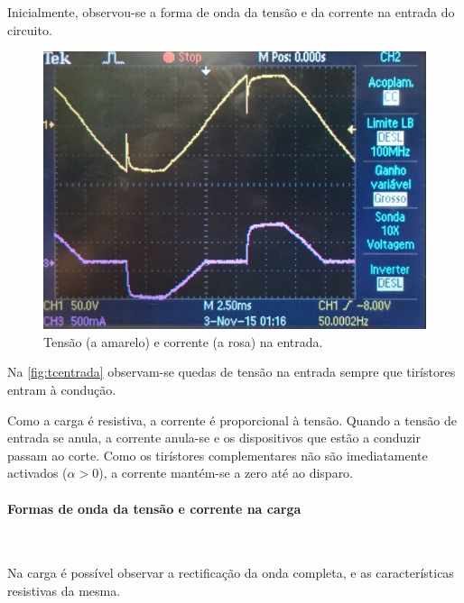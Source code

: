 \documentclass[a4paper,11pt]{article}
\numberwithin{equation}{section}
\begin{document}
Inicialmente, observou-se a forma de onda da tensão e da corrente na entrada do circuito.

\begin{figure}[H]
	\centering
	\includegraphics[keepaspectratio=true, scale=0.12]{img/DSC_0181}
	\caption{Tensão (a amarelo) e corrente (a rosa) na entrada.}
	\label{fig:tcentrada}
	\vspace{-0.8em}
\end{figure}

Na \autoref{fig:tcentrada} observam-se quedas de tensão na entrada sempre que tirístores entram à condução. 

Como a carga é resistiva, a corrente é proporcional à tensão. Quando a tensão de entrada se anula, a corrente anula-se e os dispositivos que estão a conduzir passam ao corte. Como os tirístores complementares não são imediatamente activados ($\alpha > 0$), a corrente mantém-se a zero até ao disparo.

\paragraph{Formas de onda da tensão e corrente na carga} \mbox{}\

Na carga é possível observar a rectificação da onda completa, e as características resistivas da mesma.
\end{document}
